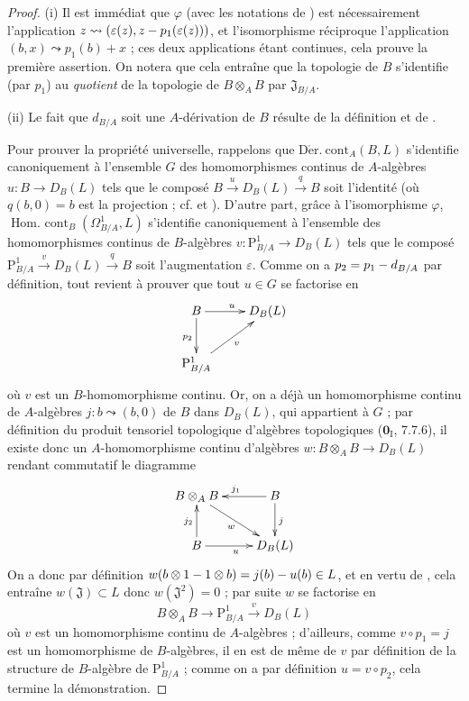 \begin{proof}
(i) Il est immédiat que $\varphi$ (avec les notations de
) est nécessairement l'application
$z\leadsto(\varepsilon(z),z- p_1(\varepsilon(z)))$, et l'isomorphisme
réciproque l'application $(b,x)\leadsto p_1(b)+x$ ; ces deux applications
étant continues, cela prouve la première assertion. On notera que cela
entraîne que la topologie de $B$ s'identifie (par $p_1$) au \emph{quotient}
de la topologie de $B\otimes_A B$ par $\mathfrak{J}_{B/A}$.

(ii) Le fait que $d_{B/A}$ soit une $A$-dérivation de $B$ résulte de la
définition  et de .

Pour prouver la propriété universelle, rappelons que
$\operatorname{D\acute{e}r.\ cont}_A(B,L)$ s'identifie canoniquement à
l'ensemble $G$ des homomorphismes continus de $A$-algèbres
$u:B\to D_B(L)$ tels que le composé
$B\xrightarrow{u}D_B(L)\xrightarrow{q}B$ soit l'identité (où $q(b,0)=b$ est
la projection ; cf.  et ). D'autre part,
grâce à l'isomorphisme $\varphi$,
$\operatorname{Hom.\ cont}_B(\Omega^1_{B/A},L)$ s'identifie canoniquement à
l'ensemble des homomorphismes continus de $B$-algèbres
$v:\mathrm{P}^1_{B/A}\to D_B(L)$ tels que le composé
$\mathrm{P}^1_{B/A}\xrightarrow{v}D_B(L)\xrightarrow{q}B$ soit
l'augmentation $\varepsilon$. Comme on a $p_2=p_1- d_{B/A}$ par définition,
tout revient à prouver que tout $u\in G$ se factorise en
\[
\xymatrix{
  B \ar[r]^u \ar[d]_{p_2} & D_B(L) \\
  \mathrm{P}^1_{B/A} \ar[ur]_v &
}
\]
où $v$ est un $B$-homomorphisme continu. Or, on a déjà un homomorphisme
continu de $A$-algèbres $j:b\leadsto(b,0)$ de $B$ dans $D_B(L)$, qui
appartient à $G$ ; par définition du produit tensoriel topologique
d'algèbres topologiques ($\mathbf{0}_{\mathrm I}$, 7.7.6), il existe donc un
$A$-homomorphisme continu d'algèbres
$w:B\otimes_A B\to D_B(L)$ rendant commutatif le diagramme
\[
\xymatrix{
  B\otimes_A B \ar[dr]_w & B \ar[l]_{j_1} \ar[d]^j \\
  B \ar[u]^{j_2} \ar[r]_u & D_B(L)
}
\]
On a donc par définition
$w(b\otimes1- 1\otimes b)=j(b)- u(b)\in L$, et en vertu de
, cela entraîne $w(\mathfrak{J})\subset L$ donc
$w(\mathfrak{J}^2)=0$ ; par suite $w$ se factorise en
\[
  B\otimes_A B\to\mathrm{P}^1_{B/A}\xrightarrow{v}D_B(L)
\]
où $v$ est un homomorphisme continu de $A$-algèbres ; d'ailleurs, comme
$v\circ p_1=j$ est un homomorphisme de $B$-algèbres, il en est de même de
$v$ par définition de la structure de $B$-algèbre de
$\mathrm{P}^1_{B/A}$ ; comme on a par définition $u=v\circ p_2$, cela
termine la démonstration.
\end{proof}

